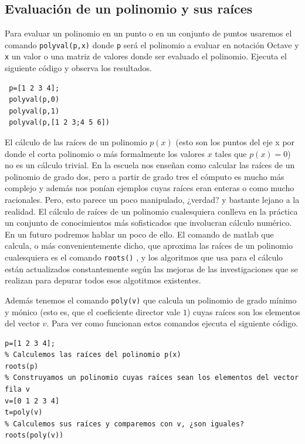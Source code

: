 \subsection{Evaluación de un polinomio y sus raíces}

Para evaluar un polinomio en un punto o en un conjunto de puntos usaremos el comando  \texttt{polyval(p,x)} donde  \texttt{p} será el polinomio a evaluar en notación Octave y  \texttt{x} un valor o una matriz de valores donde ser evaluado el polinomio. Ejecuta el siguiente código y observa los resultados.
\begin{octavebox}
\begin{verbatim}
 p=[1 2 3 4];
 polyval(p,0)
 polyval(p,1)
 polyval(p,[1 2 3;4 5 6])
\end{verbatim}
\end{octavebox}

El cálculo de las raíces de un polinomio $p(x)$ (esto son los puntos del eje x por donde el corta polinomio o más formalmente los valores $x$ tales que $p(x)=0$) no es un cálculo trivial. En la escuela nos enseñan como calcular las raíces de un polinomio de grado dos, pero a partir de grado tres el cómputo es mucho más complejo y además nos ponían ejemplos cuyas raíces eran enteras o como mucho racionales. Pero, esto parece un poco manipulado, ¿verdad? y bastante lejano a la realidad. El cálculo de raíces de un polinomio cualesquiera conlleva en la práctica un conjunto de conocimientos más sofisticados que involucran cálculo numérico. En un futuro podremos hablar un poco de ello. El comando de matlab que calcula, o más convenientemente dicho, que aproxima las raíces de un polinomio cualesquiera es el comando  \texttt{roots(\cdot)} , y los algoritmos que usa para el cálculo están actualizados constantemente según las mejoras de las investigaciones que se realizan para depurar todos esos algotitmos existentes.

Además tenemos el comando \texttt{poly(v)} que calcula un polinomio de grado mínimo y mónico (esto es, que el coeficiente director vale $1$) cuyas raíces son los elementos del vector $v$. Para ver como funcionan estos comandos ejecuta el siguiente código.

\begin{octavebox}
\begin{verbatim}
p=[1 2 3 4];
% Calculemos las raíces del polinomio p(x)
roots(p)
% Construyamos un polinomio cuyas raíces sean los elementos del vector fila v
v=[0 1 2 3 4]
t=poly(v)
% Calculemos sus raíces y comparemos con v, ¿son iguales?
roots(poly(v))
\end{verbatim}
\end{octavebox}



